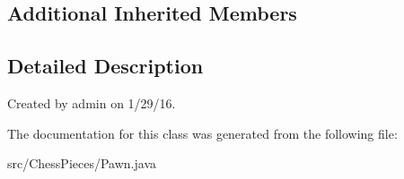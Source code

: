 \subsection*{Additional Inherited Members}


\subsection{Detailed Description}
Created by admin on 1/29/16. 

The documentation for this class was generated from the following file\+:\begin{DoxyCompactItemize}
\item 
src/\+Chess\+Pieces/Pawn.\+java\end{DoxyCompactItemize}
